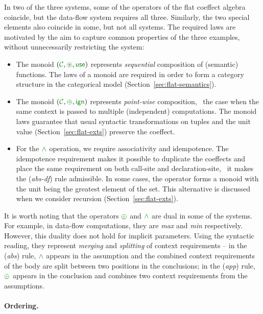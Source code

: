\noindent
In two of the three systems, some of the operators of the flat coeffect algebra coincide,
but the data-flow system requires all three. Similarly, the two special elements also 
coincide in some, but not all systems. The required laws are motivated by the aim to capture
common properties of the three examples, without unnecessarily restricting the system:

\begin{itemize}
\item The monoid $(\C, \cseq, \cunit)$ represents \emph{sequential} composition of (semantic)
functions. The laws of a monoid are required in order to form a category structure in the 
categorical model (Section~\ref{sec:flat-semantics}).

\item The monoid $(\C, \cpar, \czero)$ represents \emph{point-wise} composition, \ie~the case when the
same context is passed to multiple (independent) computations. The monoid laws guarantee 
that usual syntactic transformations on tuples and the unit value (Section~\ref{sec:flat-exts})
preserve the coeffect. 

\item For the $\czip$ operation, we require associativity and idempotence. The idempotence
requirement makes it possible to duplicate the coeffects and place the same requirement on both
call-site and declaration-site, \ie~it makes the (\emph{abs-df}) rule admissible. In some cases, 
the operator forms a monoid with the unit being the greatest element of the set. This alternative is 
discussed when we consider recursion (Section~\ref{sec:flat-exts}).
\end{itemize}

It is worth noting that the operators $\cpar$ and $\czip$ are dual in some of the systems. For 
example, in data-flow computations, they are \emph{max} and \emph{min} respectively. However, this
duality does not hold for implicit parameters. Using the syntactic reading, they represent 
\emph{merging} and \emph{splitting} of context requirements -- in the (\emph{abs}) rule, 
$\czip$ appears in the assumption and the combined context requirements of the body are split 
between two positions in the conclusions; in the (\emph{app}) rule, $\cpar$ appears in the 
conclusion and combines two context requirements from the assumptions.

\paragraph{Ordering.}

